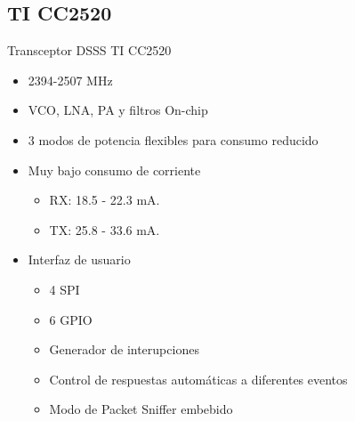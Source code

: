 \documentclass[aspectratio=169]{beamer}
\begin{document}
\subsection[TI CC2520]{TI CC2520}
\begin{frame}{Transceptor DSSS TI CC2520} 
\begin{minipage}[c]{1.0\linewidth}
	\begin{minipage}[c]{0.6\linewidth}
		\begin{itemize}
			\item 2394-2507 MHz	
			\item VCO, LNA, PA y filtros On-chip	
			\item 3 modos de potencia flexibles para consumo reducido
			\item Muy bajo consumo de corriente
			\begin{itemize}
				\item RX: 18.5 - 22.3 mA.
				\item TX: 25.8 - 33.6 mA.
			\end{itemize}
			\item Interfaz de usuario
			\begin{itemize}
				\item 4 SPI
				\item 6 GPIO
				\item Generador de interupciones
				\item Control de respuestas automáticas a diferentes eventos
				\item Modo de Packet Sniffer embebido
			\end{itemize}
			\vspace{10px}
		\end{itemize}
	\end{minipage}
	\begin{minipage}[c]{0.35\linewidth}
		\begin{figure}[H]
			\label{cc2520}
		\end{figure}	  	  	
	\end{minipage}
\end{minipage}
\end{frame}
\end{document}
